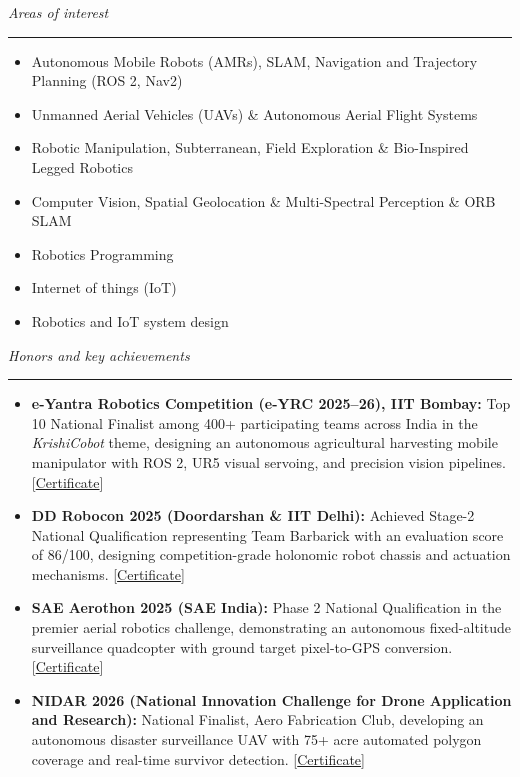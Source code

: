 \documentclass[10pt,a4paper]{article}
\newcommand{\cvsection}[1]{%
  \vspace{7pt}%
  {\color{cvblue}\itshape\large #1}\\[-4pt]%
  {\color{cvblue}\rule{\textwidth}{0.75pt}}\vspace{3pt}%
}
\begin{document}
\cvsection{Areas of interest}
\begin{itemize}[leftmargin=1.2rem,itemsep=1.5pt,topsep=2pt,parsep=0pt]
  \item Autonomous Mobile Robots (AMRs), SLAM, Navigation and Trajectory Planning (ROS 2, Nav2)
  \item Unmanned Aerial Vehicles (UAVs) \& Autonomous Aerial Flight Systems
  \item Robotic Manipulation, Subterranean, Field Exploration \& Bio-Inspired Legged Robotics
  \item Computer Vision, Spatial Geolocation \& Multi-Spectral Perception  \& ORB SLAM
  \item Robotics Programming
  \item Internet of things (IoT)
  \item Robotics and IoT system design
\end{itemize}

\cvsection{Honors and key achievements}
\begin{itemize}[leftmargin=1.2rem,itemsep=2.5pt,topsep=2pt,parsep=0pt]
  \item \textbf{e-Yantra Robotics Competition (e-YRC 2025–26), IIT Bombay:} Top 10 National Finalist among 400+ participating teams across India in the \textit{KrishiCobot} theme, designing an autonomous agricultural harvesting mobile manipulator with ROS 2, UR5 visual servoing, and precision vision pipelines. [\href{https://Humobot1812.github.io/Portfolio/assets/Certificates/eyantra_certificate.pdf}{Certificate}]
  \item \textbf{DD Robocon 2025 (Doordarshan \& IIT Delhi):} Achieved Stage-2 National Qualification representing Team Barbarick with an evaluation score of 86/100, designing competition-grade holonomic robot chassis and actuation mechanisms. [\href{https://Humobot1812.github.io/Portfolio/assets/Certificates/Robocon_certificate.jpeg}{Certificate}]
  \item \textbf{SAE Aerothon 2025 (SAE India):} Phase 2 National Qualification in the premier aerial robotics challenge, demonstrating an autonomous fixed-altitude surveillance quadcopter with ground target pixel-to-GPS conversion. [\href{https://Humobot1812.github.io/Portfolio/assets/Certificates/Aerothon_2025.png}{Certificate}]
  \item \textbf{NIDAR 2026 (National Innovation Challenge for Drone Application and Research):} National Finalist, Aero Fabrication Club, developing an autonomous disaster surveillance UAV with 75+ acre automated polygon coverage and real-time survivor detection. [\href{https://Humobot1812.github.io/Portfolio/assets/Certificates/Nidar_certificate.jpeg}{Certificate}]
\end{itemize}
\end{document}
